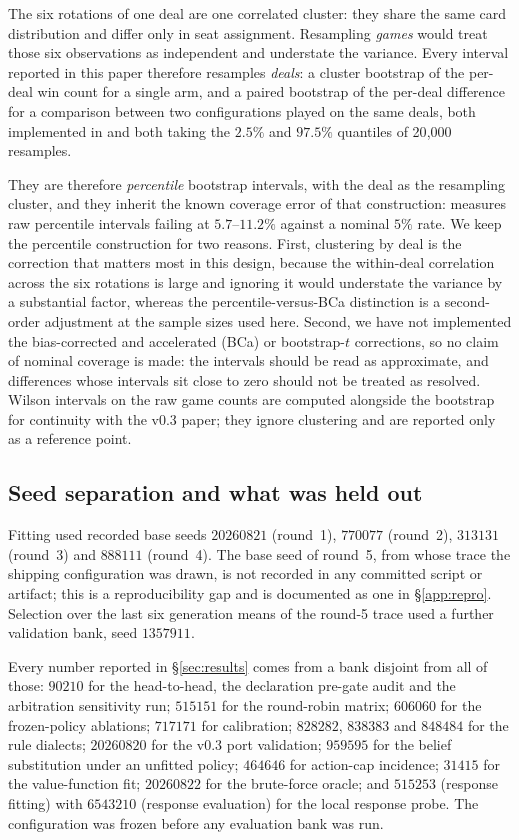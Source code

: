 \documentclass[11pt]{article}
\theoremstyle{definition}
\newcommand{\numBootstrapDraws}{20{,}000}
\begin{document}
The six rotations of one deal are one correlated cluster: they share the same
card distribution and differ only in seat assignment. Resampling \emph{games}
would treat those six observations as independent and understate the variance.
Every interval reported in this paper therefore resamples \emph{deals}: a cluster
bootstrap of the per-deal win count for a single arm, and a paired bootstrap of
the per-deal difference for a comparison between two configurations played on the
same deals, both implemented in  and both taking
the $2.5\%$ and $97.5\%$ quantiles of \numBootstrapDraws{} resamples.

They are therefore \emph{percentile} bootstrap intervals, with the deal as the
resampling cluster, and they inherit the known coverage error of that
construction: \cite{jordan-rleval} measures raw percentile intervals failing at
$5.7$--$11.2\%$ against a nominal $5\%$ rate. We keep the percentile
construction for two reasons. First, clustering by deal is the correction that
matters most in this design, because the within-deal correlation across the six
rotations is large and ignoring it would understate the variance by a
substantial factor, whereas the percentile-versus-BCa distinction is a
second-order adjustment at the sample sizes used here. Second, we have not
implemented the bias-corrected and accelerated (BCa) or bootstrap-$t$
corrections, so no claim of nominal coverage is made: the intervals should be
read as approximate, and differences whose intervals sit close to zero should not
be treated as resolved. Wilson intervals on the raw game counts are computed
alongside the bootstrap for continuity with the v0.3 paper; they ignore
clustering and are reported only as a reference point.

\subsection{Seed separation and what was held out}
\label{sec:protocol-seeds}

Fitting used recorded base seeds $20260821$ (round~1), $770077$ (round~2),
$313131$ (round~3) and $888111$ (round~4). The base seed of round~5, from
whose trace the shipping configuration was drawn, is not recorded in any
committed script or artifact; this is a reproducibility gap and is documented
as one in \S\ref{app:repro}. Selection over the last six generation means of
the round-5 trace used a further validation bank, seed $1357911$.

Every number reported in \S\ref{sec:results} comes from a bank disjoint from
all of those: $90210$ for the head-to-head, the declaration pre-gate audit and
the arbitration sensitivity run; $515151$ for the round-robin matrix; $606060$
for the frozen-policy ablations; $717171$ for calibration; $828282$, $838383$
and $848484$ for the rule dialects; $20260820$ for the v0.3 port validation;
$959595$ for the belief substitution under an unfitted policy; $464646$ for
action-cap incidence; $31415$ for the value-function fit; $20260822$ for the
brute-force oracle; and $515253$ (response fitting) with $6543210$ (response
evaluation) for the local response probe. The configuration was frozen before
any evaluation bank was run.
\end{document}

